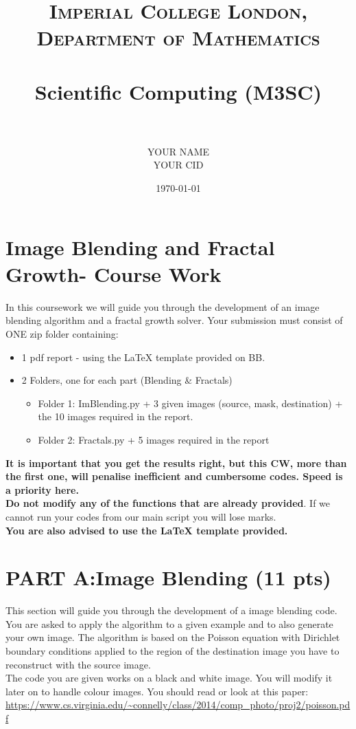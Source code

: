 \documentclass[paper=a4, fontsize=12pt]{scrartcl} %
\title{
\normalfont \normalsize
\textsc{Imperial College London, Department of Mathematics} \\ [25pt]
\horrule{0.5pt} \\[0.4cm]                      %
\huge Scientific Computing (M3SC) \\           %
\horrule{2pt} \\[0.5cm]                        %
}
\author{YOUR NAME\\
  YOUR CID}
\date{\normalsize\today}
\numberwithin{equation}{section}       %
\numberwithin{figure}{section}         %
\numberwithin{table}{section}          %
\begin{document}

\maketitle

\section*{Image Blending and Fractal Growth- Course Work}

In this coursework we will guide you through the development of an image blending algorithm and a fractal growth solver. 
Your submission must consist of ONE zip folder containing:

\begin{itemize}
\item 1 pdf report - using the LaTeX template provided on BB.
\item 2 Folders,  one for each part (Blending \& Fractals)
\begin{itemize}
\item Folder 1: ImBlending.py + 3 given images (source, mask, destination) + the 10 images required in the report.
\item Folder 2: Fractals.py  + 5  images required in the report  
\end{itemize}
\end{itemize}

\textbf{It is important that you get the results right, but this CW, more than the first one, will penalise inefficient and cumbersome codes. Speed is a priority here.}\\
\textbf{Do not modify any of the functions that are already provided}. If we cannot run your codes from our main script  you will lose marks. \\
\textbf{You are also advised to use the LaTeX template provided.}



\newpage
\section{ PART A:Image Blending (11 pts)}

This section will guide you through the development of a  image blending code. You are asked to apply the algorithm to a given example and to also generate your own image. The algorithm is based on the Poisson equation with Dirichlet boundary conditions applied to the region of the destination image you have to reconstruct with the source image.\\
The code you are given works on a  black and white image. You will modify it later on to handle colour images.
You should read or look at this paper:
\url{https://www.cs.virginia.edu/~connelly/class/2014/comp_photo/proj2/poisson.pdf}
\end{document}
